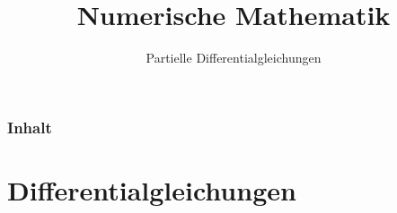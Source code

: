 

\title{Numerische Mathematik}
\subtitle{Partielle Differentialgleichungen}



\makeTitlePage

\begin{frame}\frametitle{Inhalt}
   \tableofcontents
\end{frame}
%

%

\section{Differentialgleichungen}
\makeSectionDividerPage
%
